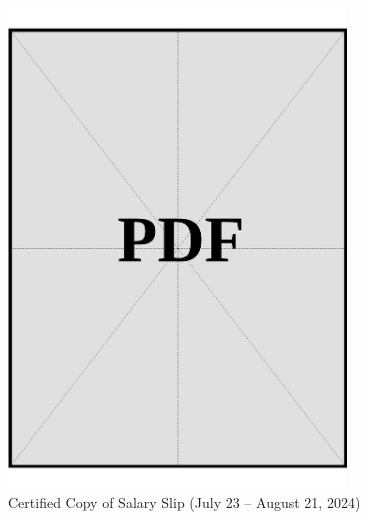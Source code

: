\begin{figure}[h]
    \centering
    \includegraphics[page=1, width=0.8\textwidth]{../docs/applicant/funds/salary-slips/month-3/certified-copies.pdf}
    \caption{Certified Copy of Salary Slip (July 23 – August 21, 2024)}
    \label{fig:month-3-certified}
\end{figure}

\vspace*{\fill}
\clearpage
